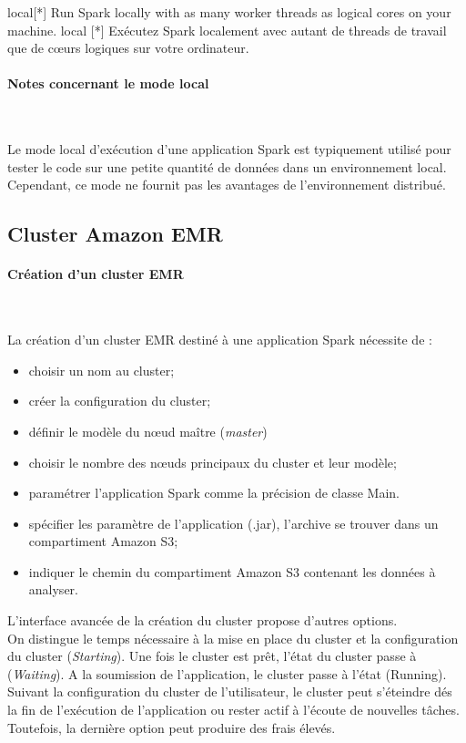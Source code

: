 local[*] Run Spark locally with as many worker threads as logical cores on your machine.
local [*] Exécutez Spark localement avec autant de threads de travail que de c\oe{}urs logiques sur votre ordinateur.

\paragraph{Notes concernant le mode local}~

Le mode local d'exécution d'une application Spark est typiquement utilisé pour tester le code sur une petite quantité de données dans un environnement local. Cependant, ce mode  ne fournit pas les avantages de l'environnement distribué. 

\subsection{Cluster Amazon EMR}

\paragraph{Création d'un cluster EMR}~

La création d'un cluster EMR destiné à une application Spark nécessite de  :
\begin{itemize}
	\item choisir un nom au cluster;
	\item créer la configuration du cluster;
	\item définir le modèle du n\oe{}ud maître (\textit{master}) 
	\item choisir le nombre des n\oe{}uds principaux  du cluster et leur modèle;
	\item paramétrer l'application Spark comme la précision de classe Main. 
	\item spécifier les paramètre de l'application  (.jar), l'archive se trouver dans  un compartiment Amazon S3;
	\item indiquer le chemin du compartiment Amazon S3 contenant  les données à analyser.
\end{itemize}
L'interface avancée de la création du cluster propose d'autres options.  \\

On distingue le temps nécessaire à la mise en place du cluster et la configuration du cluster (\textit{Starting}). Une fois le cluster est prêt, l'état du cluster passe à (\textit{Waiting}).  A la soumission de l'application, le cluster passe à l'état (Running). Suivant la configuration du cluster de l'utilisateur, le cluster peut s'éteindre dés la fin de l'exécution de l'application ou rester actif à l'écoute de nouvelles tâches. Toutefois, la dernière option peut produire des frais élevés.  


